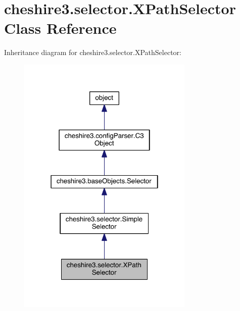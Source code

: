 \hypertarget{classcheshire3_1_1selector_1_1_x_path_selector}{\section{cheshire3.\-selector.\-X\-Path\-Selector Class Reference}
\label{classcheshire3_1_1selector_1_1_x_path_selector}
}


Inheritance diagram for cheshire3.\-selector.\-X\-Path\-Selector\-:
\nopagebreak
\begin{figure}[H]
\begin{center}
\leavevmode
\includegraphics[width=238pt]{classcheshire3_1_1selector_1_1_x_path_selector__inherit__graph}
\end{center}
\end{figure}


